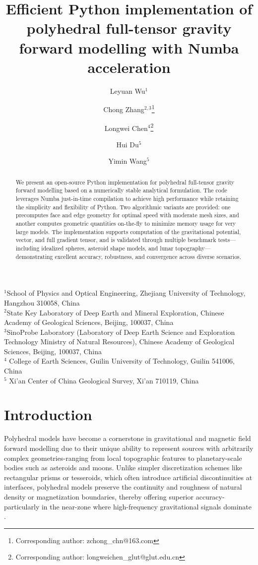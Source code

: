 \documentclass{seg}
\title{Efficient Python implementation of polyhedral full-tensor gravity forward modelling with Numba acceleration}
\author{%
  Leyuan Wu$^{1}$ \and
  Chong Zhang$^{2,3}$\thanks{Corresponding author: zchong\_chn@163.com} \and
  Longwei Chen$^{4}$\thanks{Corresponding author: longweichen\_glut@glut.edu.cn} \and
  Hui Du$^{5}$ \and
  Yimin Wang$^{5}$
}
\begin{document}
\linenumbers

\maketitle

\begin{center}
    \footnotesize
    $^{1}$School of Physics and Optical Engineering, Zhejiang University of Technology, Hangzhou 310058, China \\
    $^{2}$State Key Laboratory of Deep Earth and Mineral Exploration, Chinese Academy of Geological Sciences, Beijing, 100037, China  \\
    $^{3}$SinoProbe Laboratory (Laboratory of Deep Earth Science and Exploration Technology Ministry of Natural Resources), Chinese Academy of Geological Sciences, Beijing, 100037, China \\
    $^{4}$ College of Earth Sciences, Guilin University of Technology, Guilin 541006, China \\
    $^{5}$ Xi'an Center of China Geological Survey, Xi'an 710119, China
\end{center}


\newpage

\begin{abstract}
We present an open-source Python implementation for polyhedral full-tensor gravity forward modelling based on a numerically stable analytical formulation. The code leverages Numba just-in-time compilation to achieve high performance while retaining the simplicity and flexibility of Python. Two algorithmic variants are provided: one precomputes face and edge geometry for optimal speed with moderate mesh sizes, and another computes geometric quantities on-the-fly to minimize memory usage for very large models. The implementation supports computation of the gravitational potential, vector, and full gradient tensor, and is validated through multiple benchmark tests—including idealized spheres, asteroid shape models, and lunar topography—demonstrating excellent accuracy, robustness, and convergence across diverse scenarios.
\end{abstract}

\section*{Introduction}

Polyhedral models have become a cornerstone in gravitational and magnetic field forward modelling due to their unique ability to represent sources with arbitrarily complex geometries-ranging from local topographic features to planetary-scale bodies such as asteroids and moons. Unlike simpler discretization schemes like rectangular prisms or tesseroids, which often introduce artificial discontinuities at interfaces, polyhedral models preserve the continuity and roughness of natural density or magnetization boundaries, thereby offering superior accuracy-particularly in the near-zone where high-frequency gravitational signals dominate 
\citep{Tsoulis2001JournalofGeodesy,Hikida2007Icarus,Benedek2018JGeod,Zhang2018JGeod,Hirt2019GeophysicalResearchLetters,Holzrichter2019Geophys.J.Int.,Saraswati2019JGeod}.
\end{document}
